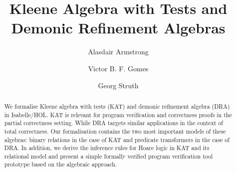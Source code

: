 \documentclass[11pt,a4paper]{article}
\begin{document}
\title{Kleene Algebra with Tests and Demonic Refinement Algebras}
\author{Alasdair Armstrong \and Victor B. F. Gomes \and Georg Struth}
\maketitle

\begin{abstract}
We formalise Kleene algebra with tests (KAT) and demonic refinement algebra
(DRA) in Isabelle/HOL. KAT is relevant for program verification and correctness
proofs in the partial correctness setting. While DRA targets similar
applications in the context of total correctness. Our formalisation contains the
two most important models of these algebras: binary relations in the case of KAT and
predicate transformers in the case of DRA. In addition, we derive the inference
rules for Hoare logic in KAT and its relational model and present a simple
formally verified program verification tool prototype based on the algebraic
approach.
\end{abstract}

\tableofcontents





\end{document}
